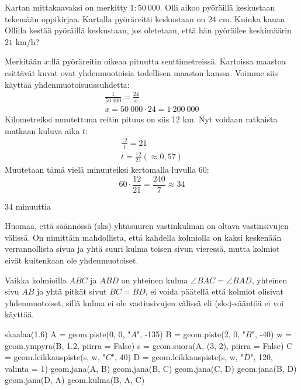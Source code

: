 \begin{esimerkki}
Kartan mittakaavaksi on merkitty $1:50\ 000$. Olli aikoo pyöräillä keskustaan tekemään
oppikirjaa. Kartalla pyöräreitti keskustaan on $24$ cm. Kuinka kauan Ollilla kestää
pyöräillä keskustaan, jos oletetaan, että hän pyöräilee keskimäärin $21$ km/h?
\begin{esimratk}
Merkitään $x$:llä pyöräreitin oikeaa pituutta senttimetreissä.
Kartoissa maastoa esittävät kuvat ovat yhdenmuotoisia todellisen maaston kanssa. Voimme
siis käyttää yhdenmuotoisuussuhdetta:
\begin{align*}
\frac{1}{50\ 000} = \frac{24}{x} \\
x = 50\ 000 \cdot 24 = 1\ 200\ 000
\end{align*}
Kilometreiksi muutettuna reitin pituus on siis 12 km. Nyt voidaan ratkaista matkaan kuluva
aika $t$:
\begin{align*}
\frac{12}{t} = 21 \\
t = \frac{12}{21} (\approx 0,57)
\end{align*}
Muutetaan tämä vielä minuuteiksi kertomalla luvulla 60:
\[
60 \cdot \frac{12}{21} = \frac{240}{7} \approx 34
\]
\end{esimratk}
\begin{esimvast}
34 minuuttia
\end{esimvast}
\end{esimerkki}

Huomaa, että säännössä (sks) yhtäsuuren vastinkulman on oltava vastinsivujen välissä. On
nimittäin mahdollista, että kahdella kolmiolla on kaksi keskenään verrannollista sivua
ja yhtä suuri kulma toisen sivun vieressä, mutta kolmiot eivät kuitenkaan ole yhdenmuotoiset.

\begin{esimerkki}
Vaikka kolmioilla $ABC$ ja $ABD$ on yhteinen kulma $\angle BAC = \angle BAD$, yhteinen sivu $AB$ ja yhtä pitkät sivut $BC = BD$, ei voida päätellä että kolmiot olisivat yhdenmuotoiset, sillä kulma ei ole vastinsivujen välissä eli (sks)-sääntöä ei voi käyttää.

\begin{kuva}
skaalaa(1.6)
A = geom.piste(0, 0, "$A$", -135)
B = geom.piste(2, 0, "$B$", -40)
w = geom.ympyra(B, 1.2, piirra = False)
s = geom.suora(A, (3, 2), piirra = False)
C = geom.leikkauspiste(s, w, "$C$", 40)
D = geom.leikkauspiste(s, w, "$D$", 120, valinta = 1)
geom.jana(A, B)
geom.jana(B, C)
geom.jana(C, D)
geom.jana(B, D)
geom.jana(D, A)
geom.kulma(B, A, C)
\end{kuva}

\end{esimerkki}


